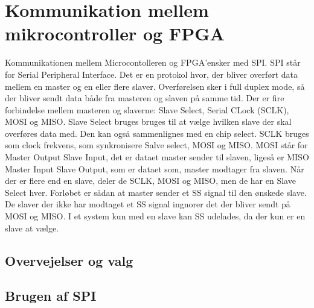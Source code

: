 \section{Kommunikation mellem mikrocontroller og FPGA}

Kommunikationen mellem Microcontolleren og FPGA’ensker med SPI. SPI står for Serial Peripheral Interface. Det er en protokol hvor, der bliver overført data mellem en master og en eller flere slaver. Overførelsen sker i full duplex mode, så der bliver sendt data både fra masteren og slaven på samme tid.
Der er fire forbindelse mellem masteren og slaverne: Slave Select, Serial CLock (SCLK), MOSI og MISO. Slave Select bruges bruges til at vælge hvilken slave der skal overføres data med. Den kan også sammenlignes med en chip select. SCLK bruges som clock frekvens, som synkronisere Salve select, MOSI og MISO. MOSI står for Master Output Slave Input, det er dataet master sender til slaven, ligeså er MISO Master Input Slave Output, som er dataet som, master modtager fra slaven.
Når der er flere end en slave, deler de SCLK, MOSI og MISO, men de har en Slave Select hver. Forløbet er sådan at master sender et SS signal til den ønskede slave. De slaver der ikke har modtaget et SS signal ingnorer det der bliver sendt på MOSI og MISO. I et system kun med en slave kan SS udelades, da der kun er en slave at vælge. 

\subsection{Overvejelser og valg}



\subsection{Brugen af SPI}